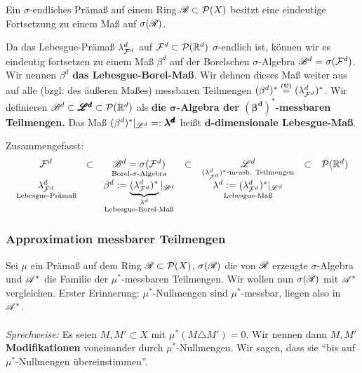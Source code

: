 \begin{korollar}
\begin{mdframed}
Ein $\sigma$-endliches Prämaß auf einem Ring $\RR \subset \PP(X)$ besitzt eine eindeutige Fortsetzung zu einem Maß auf $\sigma(\RR)$.
\end{mdframed}
\end{korollar}

\begin{definition}
\begin{mdframed}
Da das Lebesgue-Prämaß $\lambda^d_{\FF^d}$ auf $\FF^d\subset \PP(\R^d)$ $\sigma$-endlich ist, können wir es eindeutig fortsetzen zu einem Maß $\beta^d$ auf der Borelschen $\sigma$-Algebra $\BB^d = \sigma(\FF^d)$. Wir nennen $\beta^d$ \textbf{das Lebesgue-Borel-Maß}. Wir dehnen dieses Maß weiter aus auf alle (bzgl. des äußeren Maßes) messbaren Teilmengen $(\beta^d)^* \overset{\text{\Ueb}}= (\lambda^d_{\FF^d})^*$. Wir definieren $\BB^d \subset \pmb{\LL^d} \subset \PP(\R^d)$ als \textbf{die $\boldsymbol\sigma$-Algebra der $\boldsymbol{(\beta^d)^*}$-messbaren Teilmengen.} Das Maß $(\beta^d)^*|_{\LL^d} =: \boldsymbol{\lambda^{\pmb{d}}}$ heißt \textbf{$\boldsymbol{d}$-dimensionale Lebesgue-Maß}.
\end{mdframed}
\end{definition}

Zusammengefasst:
\begin{equation*}
\begin{array}{ccccccc}
\FF^d	& \subset & 
	\underset{\text{Borel-}\sigma\text{-Algebra}}{\BB^d=\sigma(\FF^d)} & \subset  & \underset{(\lambda^d_{\FF^d})^*\text{-messb. Teilmengen}}{\LL^d}	& \subset & \PP(\R^d) \\ 
\underset{\text{Lebesgue-Prämaß}}{\lambda^d_{\FF^d}} & &
\underset{\text{Lebesgue-Borel-Maß}}{\beta^d := \underbrace{(\lambda^d_{\FF^d})^*}_{\lambda^d}|_{\BB^d}} &&
\underset{\text{Lebesgue-Maß}}{\lambda^d := (\lambda^d_{\FF^d})^*|_{\LL^d}}
\end{array}
\end{equation*}

\subsubsection{Approximation messbarer Teilmengen}
Sei $\mu$ ein Prämaß auf dem Ring $\RR \subset \PP(X)$, $\sigma(\RR)$ die von $\RR$ erzeugte $\sigma$-Algebra und $\AA^*$ die Familie der $\mu^*$-messbaren Teilmengen. Wir wollen nun $\sigma(\RR)$ mit $\AA^*$ vergleichen. Erster Erinnerung: $\mu^*$-Nullmengen sind $\mu^*$-messbar, liegen also in $\AA^*$.\\\\
\textit{Sprechweise:} Es seien $M,M'\subset X$ mit $\mu^*(M \triangle M') = 0$. Wir nennen dann $M, M'$ \textbf{Modifikationen} voneinander durch $\mu^*$-Nullmengen. Wir sagen, dass sie ``bis auf $\mu^*$-Nullmengen übereinstimmen''.

